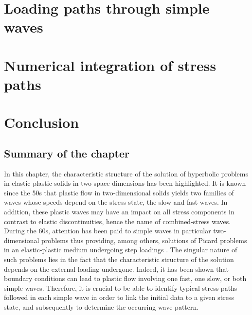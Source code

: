 \label{sec:charac_plast}


\section{Loading paths through simple waves}
\label{sec:stress_paths}



\section{Numerical integration of stress paths}
\label{sec:stress_paths_num}


% 


\section{Conclusion}

\subsection{Summary of the chapter}

In this chapter, the characteristic structure of the solution of hyperbolic problems in elastic-plastic solids in two space dimensions has been highlighted.
It is known since the 50s that plastic flow in two-dimensional solids yields two families of waves whose speeds depend on the stress state, the slow and fast waves.
In addition, these plastic waves may have an impact on all stress components in contrast to elastic discontinuities, hence the name of combined-stress waves.
During the 60s, attention has been paid to simple waves in particular two-dimensional problems thus providing, among others, solutions of Picard problems in an elastic-plastic medium undergoing step loadings \cite{Clifton,Ting68,Ting73}. %
The singular nature of such problems lies in the fact that the characteristic structure of the solution depends on the external loading undergone.
Indeed, it has been shown \cite{Clifton} that boundary conditions can lead to plastic flow involving one fast, one slow, or both simple waves.
Therefore, it is crucial to be able to identify typical stress paths followed in each simple wave in order to link the initial data to a given stress state, and subsequently to determine the occurring wave pattern.


